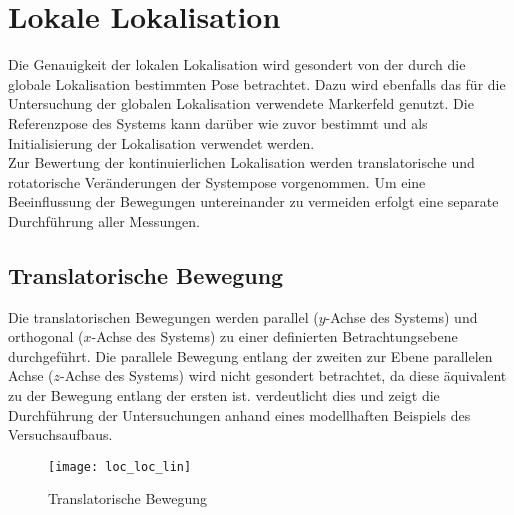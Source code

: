 




\section{Lokale Lokalisation}%
Die Genauigkeit der lokalen Lokalisation wird gesondert von der durch die globale Lokalisation bestimmten Pose betrachtet. Dazu wird ebenfalls das für die Untersuchung der globalen Lokalisation verwendete Markerfeld genutzt. Die Referenzpose des Systems kann darüber wie zuvor bestimmt und als Initialisierung der Lokalisation verwendet werden.\\

Zur Bewertung der kontinuierlichen Lokalisation werden translatorische und rotatorische Veränderungen der Systempose vorgenommen. Um eine Beeinflussung der Bewegungen untereinander zu vermeiden erfolgt eine separate Durchführung aller Messungen.\\

\subsection{Translatorische Bewegung}
Die translatorischen Bewegungen werden parallel ($y$-Achse des Systems) und orthogonal ($x$-Achse des Systems) zu einer definierten Betrachtungsebene durchgeführt. Die parallele Bewegung entlang der zweiten zur Ebene parallelen Achse ($z$-Achse des Systems) wird nicht gesondert betrachtet, da diese äquivalent zu der Bewegung entlang der ersten ist.  verdeutlicht dies und zeigt die Durchführung der Untersuchungen anhand eines modellhaften Beispiels des Versuchsaufbaus.\\

\begin{figure}[!ht]
	\begin{center}
		\texttt{[image: loc\_loc\_lin]}
		\caption{Translatorische Bewegung}
		\label{fig.transmove}
	\end{center}
\end{figure}

